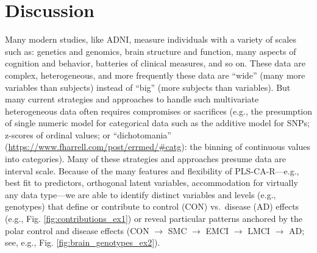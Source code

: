 \documentclass[12pt]{article}
\begin{document}
\hypertarget{discussion}{%
\section{Discussion}\label{discussion}}

\label{section:Disc}

Many modern studies, like ADNI, measure individuals with a variety of
scales such as: genetics and genomics, brain structure and function,
many aspects of cognition and behavior, batteries of clinical measures,
and so on. These data are complex, heterogeneous, and more frequently
these data are ``wide'' (many more variables than subjects) instead of
``big'' (more subjects than variables). But many current strategies and
approaches to handle such multivariate heterogeneous data often requires
compromises or sacrifices (e.g., the presumption of single numeric model
for categorical data such as the additive model for SNPs; z-scores of
ordinal values; or ``dichotomania''
(\url{https://www.fharrell.com/post/errmed/\#catg}): the binning of
continuous values into categories). Many of these strategies and
approaches presume data are interval scale. Because of the many features
and flexibility of PLS-CA-R---e.g., best fit to predictors, orthogonal
latent variables, accommodation for virtually any data type---we are
able to identify distinct variables and levels (e.g., genotypes) that
define or contribute to control (CON) vs.~disease (AD) effects (e.g.,
Fig. \ref{fig:contributions_ex1}) or reveal particular patterns anchored
by the polar control and disease effects (CON \(\rightarrow\) SMC
\(\rightarrow\) EMCI \(\rightarrow\) LMCI \(\rightarrow\) AD; see, e.g.,
Fig. \ref{fig:brain_genotypes_ex2}).
\end{document}
